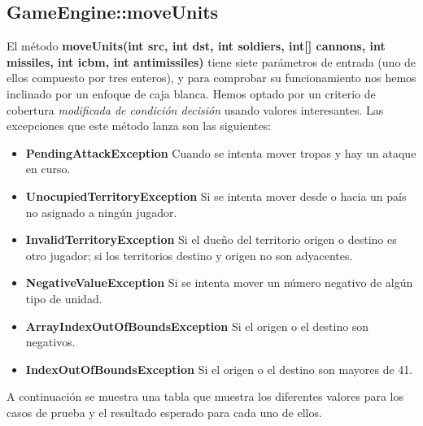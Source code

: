 \subsection{GameEngine::moveUnits}

El método \textbf{moveUnits(int src, int dst, int soldiers, int[] cannons, int missiles, int icbm, int antimissiles)} tiene siete parámetros de entrada (uno de ellos compuesto por
tres enteros), y para comprobar su funcionamiento nos hemos inclinado por un enfoque de caja blanca. Hemos optado por un criterio de 
cobertura \textit{modificada de condición decisión } usando valores interesantes. 
Las excepciones que este método lanza son las siguientes:
\begin{itemize}
\item \textbf{PendingAttackException} Cuando se intenta mover tropas y hay un ataque en curso.
\item \textbf{UnocupiedTerritoryException} Si se intenta mover desde o hacia un país no asignado a ningún jugador.
\item \textbf{InvalidTerritoryException} Si el dueño del territorio origen o destino es otro jugador; si los territorios destino y origen no son adyacentes.
\item \textbf{NegativeValueException} Si se intenta mover un número negativo de algún tipo de unidad.
\item \textbf{ArrayIndexOutOfBoundsException} Si el origen o el destino son negativos.
\item \textbf{IndexOutOfBoundsException} Si el origen o el destino son mayores de 41.
\end{itemize}

A continuación se muestra una tabla que muestra los diferentes valores para los casos de prueba y el resultado esperado para cada uno de ellos.

